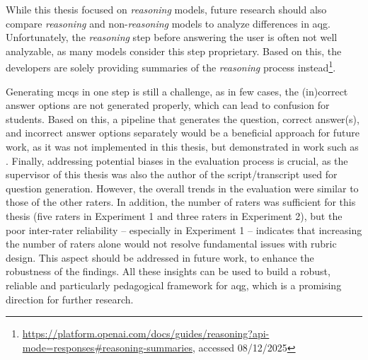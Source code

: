 While this thesis focused on \textit{reasoning} models, future research should also compare \textit{reasoning} and non-\textit{reasoning} models to analyze differences in \ac{aqg}. Unfortunately, the \textit{reasoning} step before answering the user is often not well analyzable, as many models consider this step proprietary. Based on this, the developers are solely providing summaries of the \textit{reasoning} process instead\footnote{\url{https://platform.openai.com/docs/guides/reasoning?api-mode=responses\#reasoning-summaries}, accessed 08/12/2025}.

Generating \acp{mcq} in one step is still a challenge, as in few cases, the (in)correct answer options are not generated properly, which can lead to confusion for students. Based on this, a pipeline that generates the question, correct answer(s), and incorrect answer options separately would be a beneficial approach for future work, as it was not implemented in this thesis, but demonstrated in work such as \cite{bhowmick_automating_2023}. Finally, addressing potential biases in the evaluation process is crucial, as the supervisor of this thesis was also the author of the script/transcript used for question generation. However, the overall trends in the evaluation were similar to those of the other raters. In addition, the number of raters was sufficient for this thesis (five raters in Experiment 1 and three raters in Experiment 2), but the poor inter-rater reliability -- especially in Experiment 1 -- indicates that increasing the number of raters alone would not resolve fundamental issues with rubric design. This aspect should be addressed in future work, to enhance the robustness of the findings. All these insights can be used to build a robust, reliable and particularly pedagogical framework for \ac{aqg}, which is a promising direction for further research.